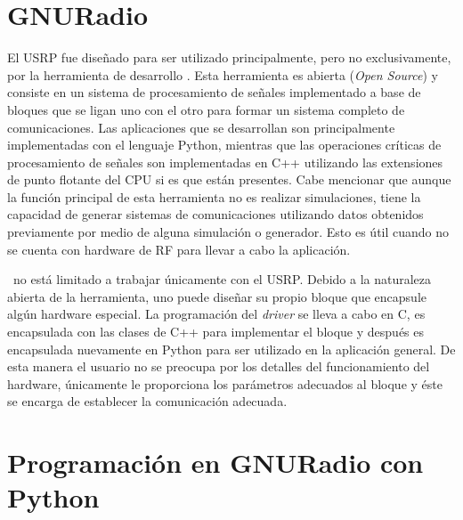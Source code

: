 
\section{GNURadio}
\label{sec:gnuradio}

El USRP fue dise\~nado para ser utilizado principalmente, pero no
exclusivamente, por la herramienta de desarrollo \gnuradio. Esta
herramienta es abierta (\emph{Open Source}) y consiste en un sistema de
procesamiento de se\~nales implementado a base de bloques que se ligan uno con
el otro para formar un sistema completo de comunicaciones. Las aplicaciones que
se desarrollan son principalmente implementadas con el lenguaje Python, mientras
que las operaciones cr\'iticas de procesamiento de se\~nales son implementadas
en C++ utilizando las extensiones de punto flotante del CPU si es que est\'an
presentes. Cabe mencionar que aunque la funci\'on principal de esta herramienta
no es realizar simulaciones, tiene la capacidad de generar sistemas de
comunicaciones utilizando datos obtenidos previamente por medio de alguna
simulaci\'on o generador. Esto es \'util cuando no se cuenta con hardware de RF
para llevar a cabo la aplicaci\'on.

\gnuradio\ no est\'a limitado a trabajar \'unicamente con el USRP. Debido a
la naturaleza abierta de la herramienta, uno puede dise\~nar su propio bloque
que encapsule alg\'un hardware especial. La programaci\'on del \emph{driver} se lleva a
cabo en C, es encapsulada con las clases de C++ para implementar el bloque y
despu\'es es encapsulada nuevamente en Python para ser utilizado en la
aplicaci\'on general. De esta manera el usuario no se preocupa por los detalles
del funcionamiento del hardware, \'unicamente le proporciona los par\'ametros
adecuados al bloque y \'este se encarga de establecer la comunicaci\'on adecuada.

\section{Programaci\'on en GNURadio con Python}

